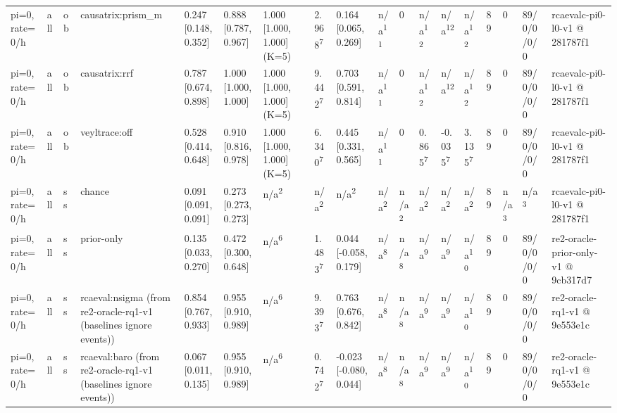 \begin{table}[t]
\begin{tabular}{llllllllllllllllll}
pi=0, rate=0/h & all & ob & causatrix:prism\_m & 0.247 [0.148, 0.352] & 0.888 [0.787, 0.967] & 1.000 [1.000, 1.000] (K=5) & 2.968\textsuperscript{7} & 0.164 [0.065, 0.269] & n/a\textsuperscript{11} & 0 & n/a\textsuperscript{12} & n/a\textsuperscript{12} & n/a\textsuperscript{12} & 89 & 0 & 89/0/0/0/0 & rcaevalc-pi0-l0-v1 @ 281787f1 \\
pi=0, rate=0/h & all & ob & causatrix:rrf & 0.787 [0.674, 0.898] & 1.000 [1.000, 1.000] & 1.000 [1.000, 1.000] (K=5) & 9.442\textsuperscript{7} & 0.703 [0.591, 0.814] & n/a\textsuperscript{11} & 0 & n/a\textsuperscript{12} & n/a\textsuperscript{12} & n/a\textsuperscript{12} & 89 & 0 & 89/0/0/0/0 & rcaevalc-pi0-l0-v1 @ 281787f1 \\
pi=0, rate=0/h & all & ob & veyltrace:off & 0.528 [0.414, 0.648] & 0.910 [0.816, 0.978] & 1.000 [1.000, 1.000] (K=5) & 6.340\textsuperscript{7} & 0.445 [0.331, 0.565] & n/a\textsuperscript{11} & 0 & 0.865\textsuperscript{7} & -0.035\textsuperscript{7} & 3.135\textsuperscript{7} & 89 & 0 & 89/0/0/0/0 & rcaevalc-pi0-l0-v1 @ 281787f1 \\
pi=0, rate=0/h & all & ss & chance & 0.091 [0.091, 0.091] & 0.273 [0.273, 0.273] & n/a\textsuperscript{2} & n/a\textsuperscript{2} & n/a\textsuperscript{2} & n/a\textsuperscript{2} & n/a\textsuperscript{2} & n/a\textsuperscript{2} & n/a\textsuperscript{2} & n/a\textsuperscript{2} & 89 & n/a\textsuperscript{3} & n/a\textsuperscript{3} & rcaevalc-pi0-l0-v1 @ 281787f1 \\
pi=0, rate=0/h & all & ss & prior-only & 0.135 [0.033, 0.270] & 0.472 [0.300, 0.648] & n/a\textsuperscript{6} & 1.483\textsuperscript{7} & 0.044 [-0.058, 0.179] & n/a\textsuperscript{8} & n/a\textsuperscript{8} & n/a\textsuperscript{9} & n/a\textsuperscript{9} & n/a\textsuperscript{10} & 89 & 0 & 89/0/0/0/0 & re2-oracle-prior-only-v1 @ 9cb317d7 \\
pi=0, rate=0/h & all & ss & rcaeval:nsigma (from re2-oracle-rq1-v1 (baselines ignore events)) & 0.854 [0.767, 0.933] & 0.955 [0.910, 0.989] & n/a\textsuperscript{6} & 9.393\textsuperscript{7} & 0.763 [0.676, 0.842] & n/a\textsuperscript{8} & n/a\textsuperscript{8} & n/a\textsuperscript{9} & n/a\textsuperscript{9} & n/a\textsuperscript{10} & 89 & 0 & 89/0/0/0/0 & re2-oracle-rq1-v1 @ 9e553e1c \\
pi=0, rate=0/h & all & ss & rcaeval:baro (from re2-oracle-rq1-v1 (baselines ignore events)) & 0.067 [0.011, 0.135] & 0.955 [0.910, 0.989] & n/a\textsuperscript{6} & 0.742\textsuperscript{7} & -0.023 [-0.080, 0.044] & n/a\textsuperscript{8} & n/a\textsuperscript{8} & n/a\textsuperscript{9} & n/a\textsuperscript{9} & n/a\textsuperscript{10} & 89 & 0 & 89/0/0/0/0 & re2-oracle-rq1-v1 @ 9e553e1c \\

\end{tabular}
\end{table}
